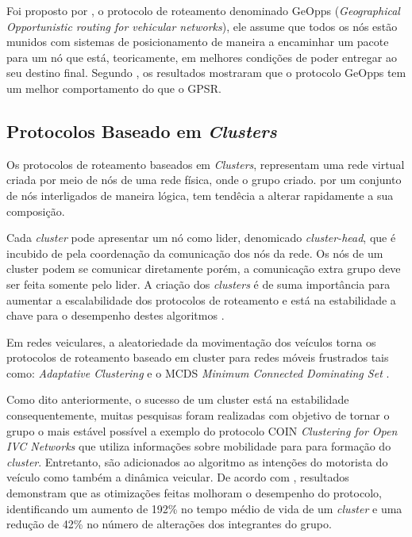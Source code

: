 \documentclass[
	12pt,				%
	oneside,			%
	a4paper,			%
	english,			%
	brazil				%
	]{abntex2ppgsi}
\begin{document}
Foi proposto por  , o protocolo de roteamento denominado GeOpps (\textit{Geographical Opportunistic routing for vehicular networks}), ele assume que todos os nós estão munidos com sistemas de posicionamento de maneira a encaminhar um pacote para um nó que está, teoricamente, em melhores condições de poder entregar  ao seu destino final. Segundo  , os resultados mostraram que o protocolo GeOpps tem um melhor comportamento do que o GPSR.

\subsection{Protocolos Baseado em \textit{Clusters} }

Os protocolos de roteamento baseados em \textit{Clusters}, representam uma rede virtual criada por meio de nós de uma rede física, onde o grupo criado. por um conjunto de nós interligados de maneira lógica, tem tendêcia a alterar rapidamente a sua composição.

Cada \textit{cluster} pode apresentar um nó como lider, denomicado \textit{cluster-head}, que é incubido de pela coordenação da comunicação dos nós da rede. Os nós de um cluster podem se comunicar diretamente porém, a comunicação extra grupo deve ser feita somente pelo lider. A criação dos \textit{clusters} é de suma importância para aumentar a escalabilidade dos protocolos de roteamento e está na estabilidade a chave para o desempenho destes algoritmos \cite{luis2009melhoria}.

Em redes veiculares, a aleatoriedade da movimentação dos veículos torna os protocolos de roteamento baseado em cluster para redes móveis frustrados tais como: \textit{Adaptative Clustering} e o MCDS \textit{Minimum Connected Dominating Set} \cite{das1997routing}.

Como dito anteriormente, o sucesso de um cluster está na estabilidade consequentemente, muitas pesquisas foram realizadas com objetivo de tornar o grupo o mais estável possível a exemplo do protocolo COIN \textit{Clustering for Open  IVC Networks} que utiliza informações sobre mobilidade para para formação do \textit{cluster}. Entretanto, são adicionados ao algoritmo as intenções do motorista do veículo como também a dinâmica veicular. De acordo com  , resultados demonstram que as otimizações feitas molhoram o desempenho do protocolo, identificando um aumento de 192\% no tempo  médio de vida de um \textit{cluster} e uma redução de 42\% no número de alterações dos integrantes do grupo.
\end{document}
